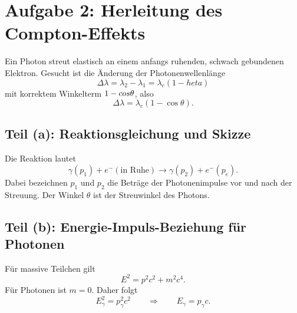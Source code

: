 \documentclass[11pt,a4paper]{scrartcl}
\newcommand{\paren}[1]{\left( #1 \right)}
\theoremstyle{definition}
\theoremstyle{plain}
\theoremstyle{remark}
\begin{document}
\FloatBarrier
\newpage

\section{Aufgabe 2: Herleitung des Compton-Effekts}

\begin{taskbox}
Ein Photon streut elastisch an einem anfangs ruhenden, schwach gebundenen Elektron. Gesucht ist die Änderung der Photonenwellenlänge
\[
    \Delta\lambda=\lambda_2-\lambda_1=\lambda_c\paren{1-	heta}
\]
mit korrektem Winkelterm $1-\\cos\theta$, also
\[
    \Delta\lambda=\lambda_c\paren{1-\cos\theta}.
\]
\end{taskbox}

\subsection{Teil (a): Reaktionsgleichung und Skizze}

\begin{solutionbox}
Die Reaktion lautet
\[
    \gamma(p_1)+e^-(\text{in Ruhe})\longrightarrow \gamma(p_2)+e^-(p_e).
\]
Dabei bezeichnen $p_1$ und $p_2$ die Beträge der Photonenimpulse vor und nach der Streuung. Der Winkel $\theta$ ist der Streuwinkel des Photons.
\end{solutionbox}

\begin{center}
\end{center}

\subsection{Teil (b): Energie-Impuls-Beziehung für Photonen}

\begin{calculationbox}
Für massive Teilchen gilt
\[
    E^2=p^2c^2+m^2c^4.
\]
Für Photonen ist $m=0$. Daher folgt
\[
    E_\gamma^2=p_\gamma^2c^2
    \qquad\Rightarrow\qquad
    E_\gamma=p_\gamma c.
\]
\end{calculationbox}
\end{document}
